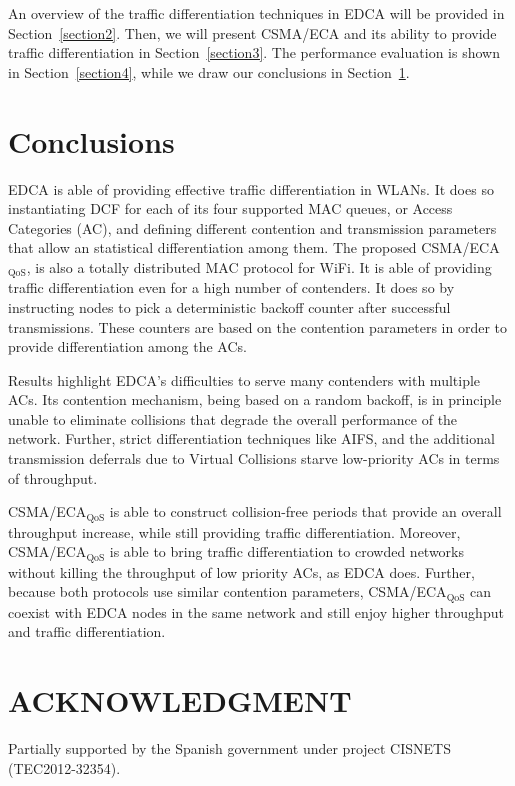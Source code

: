 \documentclass[a4paper,journal]{IEEEtran}
\begin{document}
An overview of the traffic differentiation techniques in EDCA will be provided in Section~\ref{section2}. Then, we will present CSMA/ECA and its ability to provide traffic differentiation in Section~\ref{section3}. The performance evaluation is shown in Section~\ref{section4}, while we draw our conclusions in Section~\ref{section5}.




\section{Conclusions}\label{section5}
EDCA is able of providing effective traffic differentiation in WLANs. It does so instantiating DCF for each of its four supported MAC queues, or Access Categories (AC), and defining different contention and transmission parameters that allow an statistical differentiation among them. The proposed CSMA/ECA$_{\text{QoS}}$, is also a totally distributed MAC protocol for WiFi. It is able of providing traffic differentiation even for a high number of contenders. It does so by instructing nodes to pick a deterministic backoff counter after successful transmissions. These counters are based on the contention parameters in order to provide differentiation among the ACs.

Results highlight EDCA's difficulties to serve many contenders with multiple ACs. Its contention mechanism, being based on a random backoff, is in principle unable to eliminate collisions that degrade the overall performance of the network. Further, strict differentiation techniques like AIFS, and the additional transmission deferrals due to Virtual Collisions starve low-priority ACs in terms of throughput.

CSMA/ECA$_{\text{QoS}}$ is able to construct collision-free periods that provide an overall throughput increase, while still providing traffic differentiation. Moreover, CSMA/ECA$_{\text{QoS}}$ is able to bring traffic differentiation to crowded networks without killing the throughput of low priority ACs, as EDCA does. Further, because both protocols use similar contention parameters, CSMA/ECA$_{\text{QoS}}$ can coexist with EDCA nodes in the same network and still enjoy higher throughput and traffic differentiation.

\section*{ACKNOWLEDGMENT}
Partially supported by the Spanish government under project CISNETS (TEC2012-32354).



\end{document}
